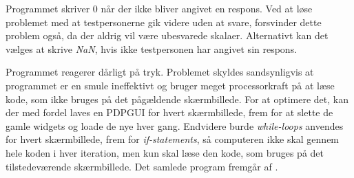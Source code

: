 Programmet skriver 0 når der ikke bliver angivet en respons. Ved at løse problemet med at testpersonerne gik videre uden at svare, forsvinder dette problem også, da der aldrig vil være ubesvarede skalaer. Alternativt kan det vælges at skrive \textit{NaN}, hvis ikke testpersonen har angivet sin respons.

Programmet reagerer dårligt på tryk. Problemet skyldes sandsynligvis at programmet er en smule ineffektivt og bruger meget processorkraft på at læse kode, som ikke bruges på det pågældende skærmbillede. For at optimere det, kan der med fordel laves en PDPGUI for hvert skærmbillede, frem for at slette de gamle widgets og loade de nye hver gang. Endvidere burde \textit{while-loops} anvendes for hvert skærmbillede, frem for \textit{if-statements}, så computeren ikke skal gennem hele koden i hver iteration, men kun skal læse den kode, som bruges på det tilstedeværende skærmbillede.\blankline
%
Det samlede program fremgår af .

